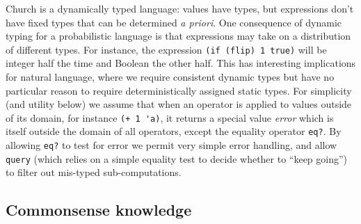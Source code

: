 \documentclass[pdfextras]{handbook}
\begin{document}
\label{bottom-val}
Church is a dynamically typed language: values have types, but expressions don't have fixed types that can be determined \emph{a priori}. 
One consequence of dynamic typing for a probabilistic language is that expressions may take on a distribution of different types. For instance, the expression \lstinline{(if (flip) 1 true)} will be integer half the time and Boolean the other half. This has interesting implications for natural language, where we require consistent dynamic types but have no particular reason to require deterministically assigned static types.
For simplicity (and utility below) we assume that when an operator is applied to values outside of its domain, for instance \lstinline{(+ 1 'a)}, it returns a special value \emph{error} which is itself outside the domain of all operators, except the equality operator \lstinline{eq?}. By allowing \lstinline{eq?} to test for error we permit very simple error handling, and allow \lstinline{query} (which relies on a simple equality test to decide whether to ``keep going'') to filter out mis-typed sub-computations.


\subsection{Commonsense knowledge}
\end{document}
